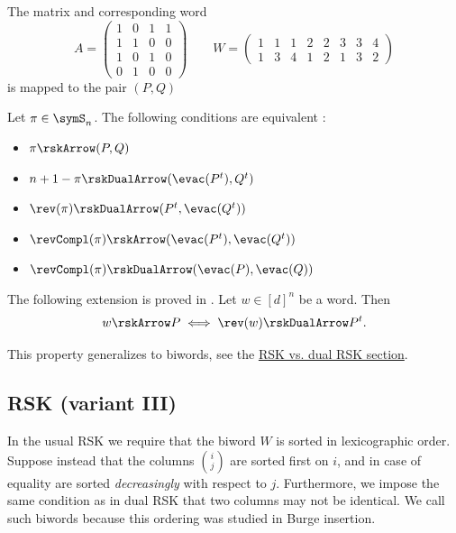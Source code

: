\begin{example*}
The matrix and corresponding word
\begin{equation*}
A = \begin{pmatrix}
1 & 0 & 1 & 1 \\
1 & 1 & 0 & 0 \\
1 & 0 & 1 & 0 \\
0 & 1 & 0 & 0
\end{pmatrix}
\qquad
W=
\begin{pmatrix}
1& 1& 1& 2& 2& 3& 3& 4 \\
1& 3& 4& 1& 2& 1& 3& 2
\end{pmatrix}
\end{equation*}
is mapped to the pair $(P,Q)$

\begin{figure}
\end{figure}
\end{example*}


\begin{proposition}
Let $\pi \in \symS_n$.
The following conditions are equivalent \cite[Thm.~4.1.1]{Leeuwen1996}:
\begin{itemize}
\item $\pi \rskArrow (P,Q)$
\item $n+1-\pi \rskDualArrow (\evac(P^t),Q^t)$
\item $\rev(\pi) \rskDualArrow (P^t,\evac(Q^t))$
\item $\revCompl(\pi) \rskArrow (\evac(P^t),\evac(Q^t))$
\item $\revCompl(\pi) \rskDualArrow (\evac(P),\evac(Q))$
\end{itemize}

The following extension is proved in \cite[Prop.~2.3.14]{Butler1994}.
Let $w \in [d]^n$ be a word. Then
\[
w \rskArrow P \iff \rev(w) \rskDualArrow P^t.
\]
\end{proposition}
This property generalizes to biwords, see the
\hyperref[RSKvsDualRSK]{RSK vs. dual RSK section}.



\subsection[rskBurge]{RSK (variant III)}


In the usual RSK we require that the biword $W$ is sorted in lexicographic
order.  Suppose instead that the columns $\binom{i}{j}$ are sorted first on
$i$, and in case of equality are sorted \emph{decreasingly} with respect to
$j$.  Furthermore, we impose the same condition as in dual RSK that two
columns may not be identical.  We call such biwords \label{burgeWords}
because this ordering was studied in Burge insertion.


